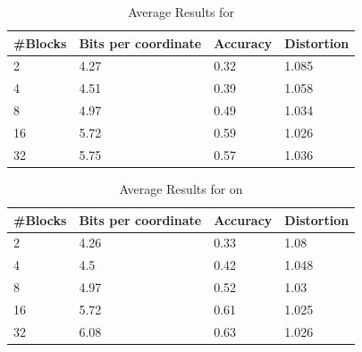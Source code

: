 \begin{table}[h!]
	\centering
	\caption{Average Results for \qs{} \clust{}}
	\label{table:avg_clust_qs}	
	\begin{tabular}{l l l l}
		\hline
		\#Blocks & Bits per coordinate & Accuracy  & Distortion \\ \hline
		2 & 4.27	& 0.32 & 1.085  \\
		4 & 4.51 & 0.39 & 1.058  \\
		8 & 4.97 & 0.49 & 1.034 \\
		16 & 5.72 & 0.59 & 1.026 \\
		32 & 5.75 & 0.57 & 1.036 \\
		\hline
	\end{tabular}
\end{table}

\begin{table}[h!]
	\centering
	\caption{Average Results for \qsr{} on \clust{}}
	\label{table:avg_clust_qsr}
	\begin{tabular}{l l l l}
		\hline
		\#Blocks & Bits per coordinate & Accuracy  & Distortion \\ \hline
		2 & 4.26 & 0.33 & 1.08  \\
		4 & 4.5 & 0.42 & 1.048  \\
		8 & 4.97 & 0.52 & 1.03 \\
		16 & 5.72 & 0.61 & 1.025 \\
		32 & 6.08 & 0.63 & 1.026 \\
		\hline
	\end{tabular}
\end{table}
